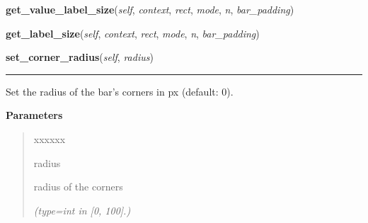     \vspace{0.5ex}

\hspace{.8\funcindent}\begin{boxedminipage}{\funcwidth}

    \raggedright \textbf{get\_value\_label\_size}(\textit{self}, \textit{context}, \textit{rect}, \textit{mode}, \textit{n}, \textit{bar\_padding})

\setlength{\parskip}{2ex}
\setlength{\parskip}{1ex}
    \end{boxedminipage}

    \label{pygtk_chart:bar_chart:Bar:get_label_size}

    \vspace{0.5ex}

\hspace{.8\funcindent}\begin{boxedminipage}{\funcwidth}

    \raggedright \textbf{get\_label\_size}(\textit{self}, \textit{context}, \textit{rect}, \textit{mode}, \textit{n}, \textit{bar\_padding})

\setlength{\parskip}{2ex}
\setlength{\parskip}{1ex}
    \end{boxedminipage}

    \label{pygtk_chart:bar_chart:Bar:set_corner_radius}

    \vspace{0.5ex}

\hspace{.8\funcindent}\begin{boxedminipage}{\funcwidth}

    \raggedright \textbf{set\_corner\_radius}(\textit{self}, \textit{radius})

    \vspace{-1.5ex}

    \rule{\textwidth}{0.5\fboxrule}
\setlength{\parskip}{2ex}
    Set the radius of the bar's corners in px (default: 0).

\setlength{\parskip}{1ex}
      \textbf{Parameters}
      \vspace{-1ex}

      \begin{quote}
        \begin{Ventry}{xxxxxx}

          \item[radius]

          radius of the corners

            {\it (type=int in [0, 100].)}

        \end{Ventry}

      \end{quote}

    \end{boxedminipage}

